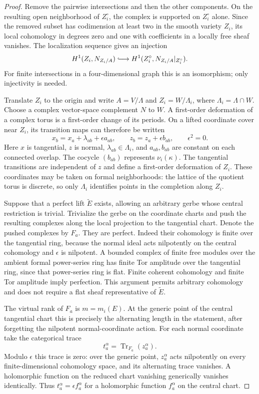 \documentclass[11pt]{article}
\theoremstyle{definition}
\theoremstyle{remark}
\begin{document}
\begin{proof}
Remove the pairwise intersections and then the other components. On the resulting open neighborhood of $Z_i^\circ$, the complex is supported on $Z_i^\circ$ alone. Since the removed subset has codimension at least two in the smooth variety $Z_i$, its local cohomology in degrees zero and one with coefficients in a locally free sheaf vanishes. The localization sequence gives an injection
\[
 H^1(Z_i,N_{Z_i/A})\lhook\joinrel\longrightarrow
 H^1(Z_i^\circ,N_{Z_i/A}|_{Z_i^\circ}).
\]
For finite intersections in a four-dimensional graph this is an isomorphism; only injectivity is needed.

Translate $Z_i$ to the origin and write $A=V/\Lambda$ and
$Z_i=W/\Lambda_i$, where $\Lambda_i=\Lambda\cap W$. Choose a complex
vector-space complement $N$ to $W$. A first-order deformation of a complex
torus is a first-order change of its periods. On a lifted coordinate cover
near $Z_i$, its transition maps can therefore be written
\[
 x_b=x_a+\lambda_{ab}+\epsilon a_{ab},\qquad
 z_b=z_a+\epsilon b_{ab},\qquad \epsilon^2=0.
\]
Here $x$ is tangential, $z$ is normal, $\lambda_{ab}\in\Lambda_i$, and
$a_{ab},b_{ab}$ are constant on each connected overlap. The cocycle
$(b_{ab})$ represents $\nu_i(\kappa)$. The tangential transitions are
independent of $z$ and define a first-order deformation of $Z_i$.
These coordinates may be taken on formal neighborhoods: the lattice of
the quotient torus is discrete, so only $\Lambda_i$ identifies points in
the completion along $Z_i$.

Suppose that a perfect lift $\widetilde E$ exists, allowing an arbitrary
gerbe whose central restriction is trivial. Trivialize the gerbe on the
coordinate charts and push the resulting complexes along the local
projection to the tangential chart. Denote the pushed complexes by $F_a$.
They are perfect. Indeed their cohomology is finite over the tangential
ring, because the normal ideal acts nilpotently on the central
cohomology and $\epsilon$ is nilpotent. A bounded complex of finite free
modules over the ambient formal power-series ring has finite Tor
amplitude over the tangential ring, since that power-series ring is flat.
Finite coherent cohomology and finite Tor amplitude imply perfection.
This argument permits arbitrary cohomology and does not require a flat
sheaf representative of $\widetilde E$.

The virtual rank of $F_a$ is $m=m_i(E)$. At the generic point of the
central tangential chart this is precisely the alternating length in the
statement, after forgetting the nilpotent normal-coordinate action.
For each normal coordinate take the categorical trace
\[
 t_a^\alpha=\operatorname{Tr}_{F_a}(z_a^\alpha).
\]
Modulo $\epsilon$ this trace is zero: over the generic point,
$z_a^\alpha$ acts nilpotently on every finite-dimensional cohomology
space, and its alternating trace vanishes. A holomorphic function on the
reduced chart vanishing generically vanishes identically. Thus
$t_a^\alpha=\epsilon f_a^\alpha$ for a holomorphic function
$f_a^\alpha$ on the central chart.


\end{proof}
\end{document}
